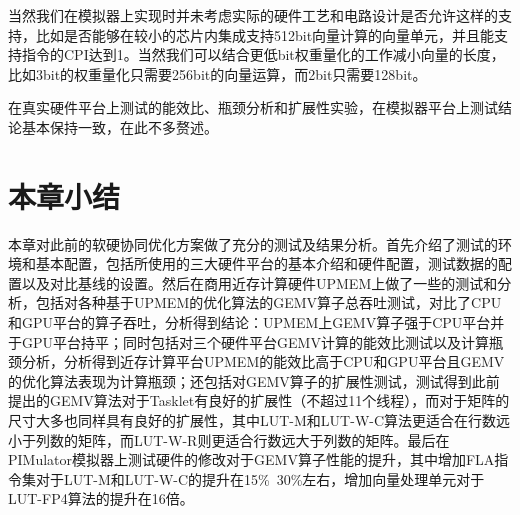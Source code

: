 当然我们在模拟器上实现时并未考虑实际的硬件工艺和电路设计是否允许这样的支持，比如是否能够在较小的芯片内集成支持512bit向量计算的向量单元，并且能支持指令的CPI达到1。当然我们可以结合更低bit权重量化的工作减小向量的长度，比如3bit的权重量化只需要256bit的向量运算，而2bit只需要128bit。

在真实硬件平台上测试的能效比、瓶颈分析和扩展性实验，在模拟器平台上测试结论基本保持一致，在此不多赘述。

\section{本章小结}
本章对此前的软硬协同优化方案做了充分的测试及结果分析。首先介绍了测试的环境和基本配置，包括所使用的三大硬件平台的基本介绍和硬件配置，测试数据的配置以及对比基线的设置。然后在商用近存计算硬件UPMEM上做了一些的测试和分析，包括对各种基于UPMEM的优化算法的GEMV算子总吞吐测试，对比了CPU和GPU平台的算子吞吐，分析得到结论：UPMEM上GEMV算子强于CPU平台并于GPU平台持平；同时包括对三个硬件平台GEMV计算的能效比测试以及计算瓶颈分析，分析得到近存计算平台UPMEM的能效比高于CPU和GPU平台且GEMV的优化算法表现为计算瓶颈；还包括对GEMV算子的扩展性测试，测试得到此前提出的GEMV算法对于Tasklet有良好的扩展性（不超过11个线程），而对于矩阵的尺寸大多也同样具有良好的扩展性，其中LUT-M和LUT-W-C算法更适合在行数远小于列数的矩阵，而LUT-W-R则更适合行数远大于列数的矩阵。最后在PIMulator模拟器上测试硬件的修改对于GEMV算子性能的提升，其中增加FLA指令集对于LUT-M和LUT-W-C的提升在15\%~30\%左右，增加向量处理单元对于LUT-FP4算法的提升在16倍。